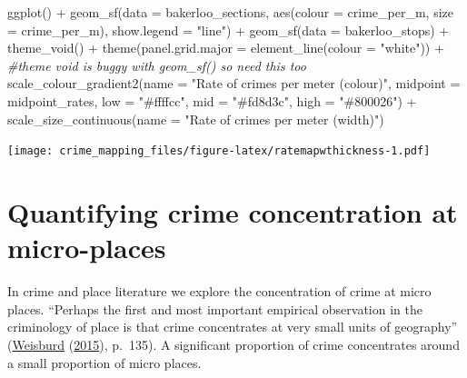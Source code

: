 \documentclass[
  krantz2]{krantz}
\makeatletter
\newenvironment{Shaded}{\begin{snugshade}}{\end{snugshade}}
\newcommand{\AttributeTok}[1]{\textcolor[rgb]{0.61,0.61,0.61}{#1}}
\newcommand{\CommentTok}[1]{\textcolor[rgb]{0.37,0.37,0.37}{\textit{#1}}}
\newcommand{\FunctionTok}[1]{\textcolor[rgb]{0,0,0}{#1}}
\newcommand{\NormalTok}[1]{#1}
\newcommand{\SpecialCharTok}[1]{\textcolor[rgb]{0,0,0}{#1}}
\newcommand{\StringTok}[1]{\textcolor[rgb]{0.5,0.5,0.5}{#1}}
\newenvironment{kframe}{%
\medskip{}
\setlength{\fboxsep}{.8em}
 \def\at@end@of@kframe{}%
 \ifinner\ifhmode%
  \def\at@end@of@kframe{\end{minipage}}%
  \begin{minipage}{\columnwidth}%
 \fi\fi%
 \def\FrameCommand##1{\hskip\@totalleftmargin \hskip-\fboxsep
 \colorbox{shadecolor}{##1}\hskip-\fboxsep
     \hskip-\linewidth \hskip-\@totalleftmargin \hskip\columnwidth}%
 \MakeFramed {\advance\hsize-\width
   \@totalleftmargin\z@ \linewidth\hsize
   \@setminipage}}%
 {\par\unskip\endMakeFramed%
 \at@end@of@kframe}
\renewenvironment{Shaded}{\begin{kframe}}{\end{kframe}}
\makeatother
\begin{document}
\begin{Shaded}
\begin{Highlighting}[]
\FunctionTok{ggplot}\NormalTok{() }\SpecialCharTok{+} 
  \FunctionTok{geom\_sf}\NormalTok{(}\AttributeTok{data =}\NormalTok{ bakerloo\_sections, }\FunctionTok{aes}\NormalTok{(}\AttributeTok{colour =}\NormalTok{ crime\_per\_m, }\AttributeTok{size =}\NormalTok{ crime\_per\_m), }\AttributeTok{show.legend =} \StringTok{"line"}\NormalTok{) }\SpecialCharTok{+} 
  \FunctionTok{geom\_sf}\NormalTok{(}\AttributeTok{data =}\NormalTok{ bakerloo\_stops) }\SpecialCharTok{+} 
  \FunctionTok{theme\_void}\NormalTok{() }\SpecialCharTok{+} 
  \FunctionTok{theme}\NormalTok{(}\AttributeTok{panel.grid.major =} \FunctionTok{element\_line}\NormalTok{(}\AttributeTok{colour =} \StringTok{"white"}\NormalTok{)) }\SpecialCharTok{+}  \CommentTok{\#theme void is buggy with geom\_sf() so need this too}
  \FunctionTok{scale\_colour\_gradient2}\NormalTok{(}\AttributeTok{name =} \StringTok{"Rate of crimes per meter (colour)"}\NormalTok{, }
                         \AttributeTok{midpoint =}\NormalTok{ midpoint\_rates,}
                         \AttributeTok{low =} \StringTok{"\#ffffcc"}\NormalTok{, }\AttributeTok{mid =} \StringTok{"\#fd8d3c"}\NormalTok{, }\AttributeTok{high =} \StringTok{"\#800026"}\NormalTok{) }\SpecialCharTok{+}
  \FunctionTok{scale\_size\_continuous}\NormalTok{(}\AttributeTok{name =} \StringTok{"Rate of crimes per meter (width)"}\NormalTok{) }
\end{Highlighting}
\end{Shaded}

\texttt{[image: crime\_mapping\_files/figure-latex/ratemapwthickness-1.pdf]}

\hypertarget{quantifying-crime-concentration-at-micro-places}{%
\section{Quantifying crime concentration at micro-places}\label{quantifying-crime-concentration-at-micro-places}}

In crime and place literature we explore the concentration of crime at micro places. ``Perhaps the first and most important empirical observation in the criminology of place is that crime concentrates at very small units of geography'' (\protect\hyperlink{ref-Weisburd_2015}{Weisburd} (\protect\hyperlink{ref-Weisburd_2015}{2015}), p.~135). A significant proportion of crime concentrates around a small proportion of micro places.
\end{document}
